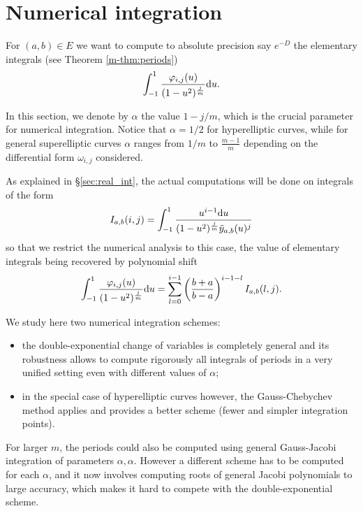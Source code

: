 \documentclass[main.tex]{subfiles}
\begin{document}
  \section{Numerical integration}\label{sec:numerical_integration}

  For $(a,b) \in E$ we want to compute to absolute precision say $e^{-D}$ the elementary integrals
  (see Theorem \ref{m-thm:periods})
\begin{align*}
 \int_{-1}^1 \frac{\varphi_{i,j}(u)}{(1-u^2)^{\frac{j}{m}}}  \mathrm d u.
\end{align*}

In this section, we denote by $α$ the value $1-j/m$, which is the crucial parameter for numerical integration.
Notice that $α=1/2$ for hyperelliptic curves, while for general superelliptic curves $α$ ranges
from $1/m$ to $\frac{m-1}m$ depending on the differential form $\omega_{i,j}$ considered.


As explained in \S \ref{sec:real_int}, the actual computations will be done on integrals of the form
\begin{equation}
    \label{eq:elem_num_int}
    I_{a,b}(i,j) = \int_{-1}^1\frac{u^{i-1}\mathrm d u}{(1-u^2)^{\frac jm}\tilde{y}_{a,b}(u)^j}
\end{equation}
so that we restrict the numerical analysis to this case,
the value of elementary integrals being recovered by polynomial shift
\begin{equation}
    \int_{-1}^1\frac{\varphi_{i,j}(u)}{(1-u^2)^{\frac jm}}\mathrm d u
    = \sum_{l=0}^{i-1} \left(\frac{b+a}{b-a}\right)^{i-1-l} I_{a,b}(l,j).
\end{equation}

We study here two numerical integration schemes:
\begin{itemize}
    \item 
the double-exponential change of variables is completely general and its robustness
allows to compute rigorously all integrals of periods in a very unified setting
even with different values of $\alpha$;
\item in the special case of hyperelliptic curves however, the Gauss-Chebychev method applies and
    provides a better scheme (fewer and simpler integration points).
\end{itemize}
For larger $m$, the periods could also be computed using general Gauss-Jacobi integration
of parameters $\alpha,\alpha$. However a different scheme has to be computed for each $\alpha$,
and it now involves computing roots of general Jacobi polynomials to large accuracy, which
makes it hard to compete with the double-exponential scheme.
\end{document}
